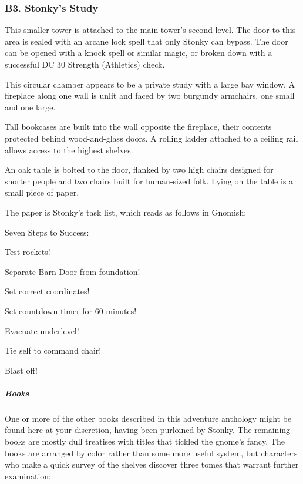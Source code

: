\documentclass[10pt,a4paper,twoside,bg=print,twocolumn,openany,nodeprecatedcode]{dndbook}
\begin{document}
\subsubsection{B3. Stonky's Study}
This smaller tower is attached to the main tower's second level. The door to this area is sealed with an arcane lock spell that only Stonky can bypass. The door can be opened with a knock spell or similar magic, or broken down with a successful DC 30 Strength (Athletics) check.

\begin{DndReadAloud}{}
This circular chamber appears to be a private study with a large bay window. A fireplace along one wall is unlit and faced by two burgundy armchairs, one small and one large.

Tall bookcases are built into the wall opposite the fireplace, their contents protected behind wood-and-glass doors. A rolling ladder attached to a ceiling rail allows access to the highest shelves.

An oak table is bolted to the floor, flanked by two high chairs designed for shorter people and two chairs built for human-sized folk. Lying on the table is a small piece of paper.

\end{DndReadAloud}

The paper is Stonky's task list, which reads as follows in Gnomish:

\begin{DndReadAloud}{}
Seven Steps to Success:

Test rockets!

Separate Barn Door from foundation!

Set correct coordinates!

Set countdown timer for 60 minutes!

Evacuate underlevel!

Tie self to command chair!

Blast off!

\end{DndReadAloud}

\subparagraph{Books}
One or more of the other books described in this adventure anthology might be found here at your discretion, having been purloined by Stonky. The remaining books are mostly dull treatises with titles that tickled the gnome's fancy. The books are arranged by color rather than some more useful system, but characters who make a quick survey of the shelves discover three tomes that warrant further examination:
\end{document}
